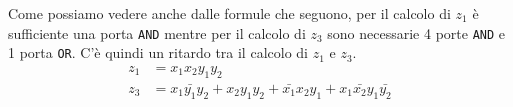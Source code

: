 Come possiamo vedere anche dalle formule che seguono, per il calcolo di $z_1$ è sufficiente una
porta \verb|AND| mentre per il calcolo di $z_3$ sono necessarie 4 porte \verb|AND| e 1 porta
\verb|OR|. C'è quindi un ritardo tra il calcolo di $z_1$ e $z_3$.
\begin{align*}
	z_1 & = x_1 x_2 y_1 y_2                                                                   \\
	z_3 & = x_1 \bar{y_1} y_2 + x_2 y_1 y_2 + \bar{x_1} x_2 y_1 + x_1 \bar{x_2} y_1 \bar{y_2}
\end{align*}